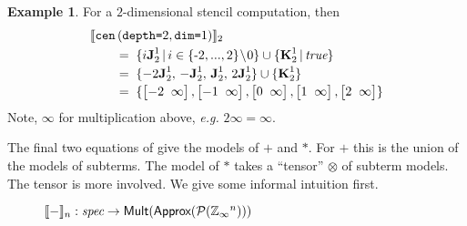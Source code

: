 \documentclass[10pt,preprint,numbers]{sigplanconf}
\newcounter{block}
\theoremstyle{definition}
\newtheorem{example}[block]{Example}
\newcommand{\eg}{\emph{e.g.}}
\newcommand{\interp}[1]{\llbracket{#1}\rrbracket}
\newcommand{\term}[1]{\texttt{#1}}
\newcommand{\stenCenS}[2]{\term{cen} \, (\term{depth=}#1,
  \term{dim=}#2)}
\newcommand{\vtwoh}[2]{\setlength{\arraycolsep}{0em}
\left[\begin{array}{cc}#1 \; & \; #2\end{array}\right]}
\newcommand{\singleEntry}[2]{\textbf{J}_{#2}^{#1}}
\newcommand{\zeroEntry}[2]{\textbf{K}_{#2}^{#1}}
\begin{document}
\begin{example}
For a $2$-dimensional stencil computation, then
\begin{align*}
& \interp{\stenCenS{2}{1}}_2 \\[-0.1em]
& \qquad = \; \{i\singleEntry{1}{2} \,|\, i \in \{\text{-}2,..., 2\}\!\setminus\!0 \}
  \cup  \{ \zeroEntry{1}{2} \,|\, \textit{true} \} \\[-0.2em]
& \qquad = \; \{-2\singleEntry{1}{2}, \, -\singleEntry{1}{2}, \,
  \singleEntry{1}{2}, \, 2\singleEntry{1}{2}\} \cup
  \{\zeroEntry{1}{2}\} \\[-0.2em]
& \qquad = \; \{\vtwoh{-2}{\infty}, \vtwoh{-1}{\infty}, \vtwoh{0}{\infty},
\vtwoh{1}{\infty}, \vtwoh{2}{\infty}\}
\end{align*}
Note, $\infty$ for multiplication above, \eg{} $2
 \infty = \infty$.
\end{example}
\noindent
The final two equations of  give the models
of $\term{+}$ and $\term{*}$. For $\term{+}$ this is the
 union of the models of subterms. The model of
$\term{*}$ takes a ``tensor'' $\otimes$ of subterm models. The tensor is
more involved. We give some informal intuition first.



%


%

\begin{figure}
\vspace{-1em}

\caption{%
$\interp{-}_n : \textit{spec} \rightarrow \textsf{Mult}(\textsf{Approx}(\mathcal{P}(\domainVal{}^n)))$}
\label{fig:spatial-model}
\vspace{-0.75em}
\end{figure}
\end{document}
